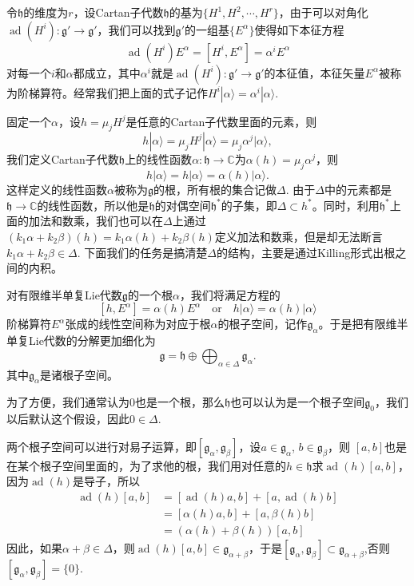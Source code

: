 \documentclass[9pt]{extarticle}
\newcommand{\cc}{\mathbb{C}}
\newcommand{\lag}{{\mathfrak{g}}}
\DeclareMathOperator{\ad}{ad}
\begin{document}
令$\mathfrak{h}$的维度为$r$，设Cartan子代数$\mathfrak{h}$的基为$\{H^1,H^2,\cdots,H^r\}$，由于可以对角化$\ad(H^i):\lag'\to\lag'$，我们可以找到$\lag'$的一组基$\{E^\alpha\}$使得如下本征方程
\[
	\ad(H^i)E^\alpha=[H^i,E^\alpha]=\alpha^iE^\alpha
\]
对每一个$i$和$\alpha$都成立，其中$\alpha^i$就是$\ad(H^i):\lag'\to \lag'$的本征值，本征矢量$E^\alpha$被称为阶梯算符。经常我们把上面的式子记作$H^i|\alpha\rangle=\alpha^i|\alpha\rangle$.


固定一个$\alpha$，设$h=\mu_jH^j$是任意的Cartan子代数里面的元素，则
\[
	h|\alpha\rangle=\mu_jH^j|\alpha\rangle=\mu_j\alpha^j|\alpha\rangle,
\]
我们定义Cartan子代数$\mathfrak{h}$上的线性函数$\alpha:\mathfrak{h}\to\cc$为$\alpha(h)=\mu_j\alpha^j$，则
\[
	h|\alpha\rangle=h|\alpha\rangle=\alpha(h)|\alpha\rangle.
\]
这样定义的线性函数$\alpha$被称为$\lag$的根，所有根的集合记做$\Delta$. 由于$\Delta$中的元素都是$\mathfrak{h}\to \cc$的线性函数，所以他是$\mathfrak{h}$的对偶空间$\mathfrak{h}^*$的子集，即$\Delta\subset h^*$。同时，利用$\mathfrak{h}^*$上面的加法和数乘，我们也可以在$\Delta$上通过$(k_1\alpha+k_2\beta)(h)=k_1\alpha(h)+k_2\beta(h)$定义加法和数乘，但是却无法断言$k_1\alpha+k_2\beta\in \Delta$. 下面我们的任务是搞清楚$\Delta$的结构，主要是通过Killing形式出根之间的内积。

\para 对有限维半单复Lie代数$\lag$的一个根$\alpha$，我们将满足方程的
\[
	[h,E^\alpha]=\alpha(h)E^\alpha\quad\text{or}\quad h|\alpha\rangle=\alpha(h)|\alpha\rangle
\]
阶梯算符$E^\alpha$张成的线性空间称为对应于根$\alpha$的根子空间，记作$\lag_{\alpha}$。于是把有限维半单复Lie代数的分解更加细化为
\[
	\lag=\mathfrak{h}\oplus \bigoplus_{\alpha\in\Delta} \lag_\alpha.
\]
其中$\lag_\alpha$是诸根子空间。

为了方便，我们通常认为$0$也是一个根，那么$\mathfrak{h}$也可以认为是一个根子空间$\lag_0$，我们以后默认这个假设，因此$0\in\Delta$.

\para 两个根子空间可以进行对易子运算，即$[\lag_\alpha,\lag_\beta]$，设$a\in\lag_\alpha$, $b\in\lag_\beta$，则
$[a,b]$也是在某个根子空间里面的，为了求他的根，我们用对任意的$h\in \mathfrak{h}$求$\ad(h)[a,b]$，因为$\ad(h)$是导子，所以
\[
	\begin{split}
		\ad(h)[a,b]&=[\ad(h)a,b]+[a,\ad(h)b]\\
		&=[\alpha(h)a,b]+[a,\beta(h)b]\\
		&=(\alpha(h)+\beta(h))[a,b]
	\end{split}
\]
因此，如果$\alpha+\beta\in\Delta$，则$\ad(h)[a,b]\in \lag_{\alpha+\beta}$，于是$[\lag_\alpha,\lag_\beta]\subset \lag_{\alpha+\beta}$,否则$[\lag_\alpha,\lag_\beta]=\{0\}$.
\end{document}
